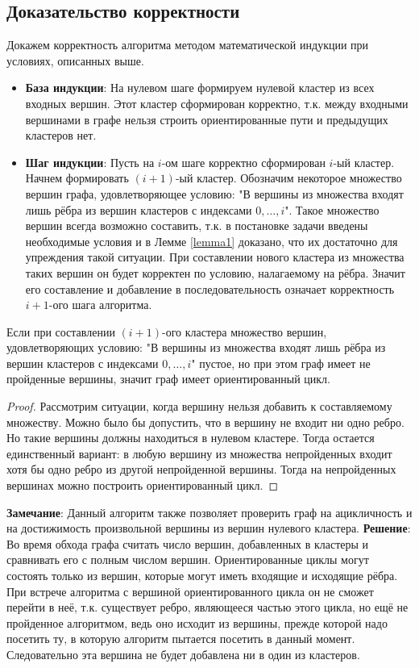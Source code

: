 \subsection{Доказательство корректности}
\label{sec:validalg}
Докажем корректность алгоритма методом математической индукции при условиях, описанных выше. 
\begin{itemize}
    \item \textbf{База индукции}: На нулевом шаге формируем нулевой кластер из всех входных вершин. Этот кластер сформирован корректно, т.к. между входными вершинами в графе нельзя строить ориентированные пути и предыдущих кластеров нет.
    \item \textbf{Шаг индукции}: Пусть на $i$-ом шаге корректно сформирован $i$-ый кластер. Начнем формировать $(i+1)$-ый кластер. Обозначим некоторое множество вершин графа, удовлетворяющее условию: "В вершины из множества входят лишь рёбра из вершин кластеров с индексами $0, \ldots, i$". Такое множество вершин всегда возможно составить, т.к. в постановке задачи введены необходимые условия и в Лемме \ref{lemma1} доказано, что их достаточно для упреждения такой ситуации. При составлении нового кластера из множества таких вершин он будет корректен по условию, налагаемому на рёбра. Значит его составление и добавление в последовательность означает корректность $i+1$-ого шага алгоритма.
\end{itemize}
\begin{lemma}\label{lemma1}
Если при составлении $(i+1)$-ого кластера множество вершин, удовлетворяющих условию: "В вершины из множества входят лишь рёбра из вершин кластеров с индексами $0, \ldots, i$" пустое, но при этом граф имеет не пройденные вершины, значит граф имеет ориентированный цикл.
\end{lemma}
\begin{proof}
Рассмотрим ситуации, когда вершину нельзя добавить к составляемому множеству. Можно было бы допустить, что в вершину не входит ни одно ребро. Но такие вершины должны находиться в нулевом кластере. Тогда остается единственный вариант: в любую вершину из множества непройденных входит хотя бы одно ребро из другой непройденной вершины. Тогда на непройденных вершинах можно построить ориентированный цикл.
\end{proof}
\textbf{Замечание}: Данный алгоритм также позволяет проверить граф на ацикличность и на достижимость произвольной вершины из вершин нулевого кластера. \newline
\textbf{Решение}: Во время обхода графа считать число вершин, добавленных в кластеры и сравнивать его с полным числом вершин. Ориентированные циклы могут состоять только из вершин, которые могут иметь входящие и исходящие рёбра. При встрече алгоритма с вершиной ориентированного цикла он не сможет перейти в неё, т.к. существует ребро, являющееся частью этого цикла, но ещё не пройденное алгоритмом, ведь оно исходит из вершины, прежде которой надо посетить ту, в которую алгоритм пытается посетить в данный момент. Следовательно эта вершина не будет добавлена ни в один из кластеров.

